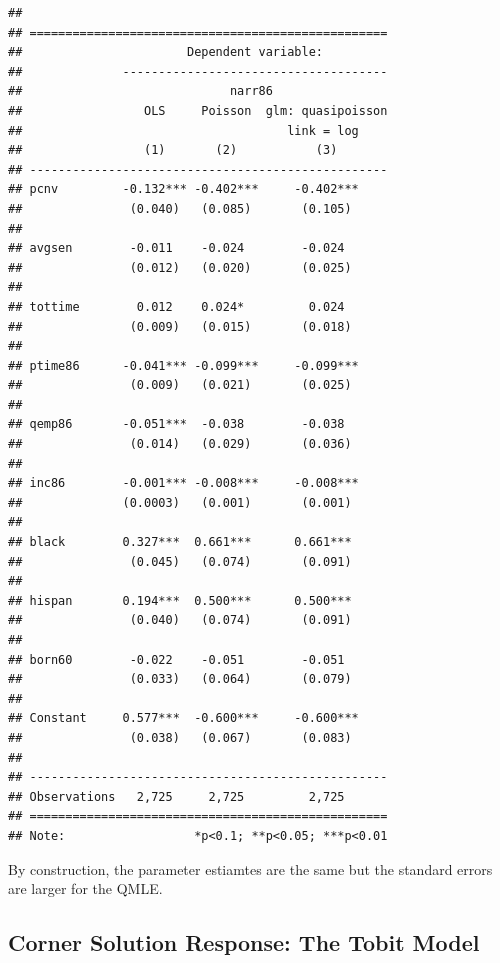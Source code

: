 \documentclass[]{book}
\begin{document}
\begin{verbatim}
## 
## ==================================================
##                       Dependent variable:         
##              -------------------------------------
##                             narr86                
##                 OLS     Poisson  glm: quasipoisson
##                                     link = log    
##                 (1)       (2)           (3)       
## --------------------------------------------------
## pcnv         -0.132*** -0.402***     -0.402***    
##               (0.040)   (0.085)       (0.105)     
##                                                   
## avgsen        -0.011    -0.024        -0.024      
##               (0.012)   (0.020)       (0.025)     
##                                                   
## tottime        0.012    0.024*         0.024      
##               (0.009)   (0.015)       (0.018)     
##                                                   
## ptime86      -0.041*** -0.099***     -0.099***    
##               (0.009)   (0.021)       (0.025)     
##                                                   
## qemp86       -0.051***  -0.038        -0.038      
##               (0.014)   (0.029)       (0.036)     
##                                                   
## inc86        -0.001*** -0.008***     -0.008***    
##              (0.0003)   (0.001)       (0.001)     
##                                                   
## black        0.327***  0.661***      0.661***     
##               (0.045)   (0.074)       (0.091)     
##                                                   
## hispan       0.194***  0.500***      0.500***     
##               (0.040)   (0.074)       (0.091)     
##                                                   
## born60        -0.022    -0.051        -0.051      
##               (0.033)   (0.064)       (0.079)     
##                                                   
## Constant     0.577***  -0.600***     -0.600***    
##               (0.038)   (0.067)       (0.083)     
##                                                   
## --------------------------------------------------
## Observations   2,725     2,725         2,725      
## ==================================================
## Note:                  *p<0.1; **p<0.05; ***p<0.01
\end{verbatim}

By construction, the parameter estiamtes are the same but the standard
errors are larger for the QMLE.

\hypertarget{corner-solution-response-the-tobit-model}{%
\subsection{Corner Solution Response: The Tobit
Model}\label{corner-solution-response-the-tobit-model}}
\end{document}
